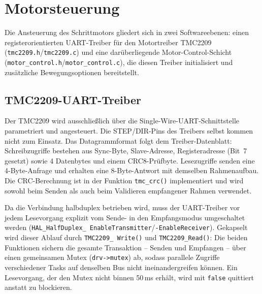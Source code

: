 \section{Motorsteuerung}

Die Ansteuerung des Schrittmotors gliedert sich in zwei Softwareebenen: einen registerorientierten UART-Treiber für den Motortreiber TMC2209 (\texttt{tmc2209.h}/\texttt{tmc2209.c}) und eine darüberliegende Motor-Control-Schicht (\texttt{motor\_control.h}/\texttt{motor\_control.c}), die diesen Treiber initialisiert und zusätzliche Bewegungsoptionen bereitstellt.

\subsection{TMC2209-UART-Treiber}

Der TMC2209 wird ausschließlich über die Single-Wire-UART-Schnittstelle  parametriert und angesteuert. Die STEP/DIR-Pins des Treibers selbst kommen nicht zum Einsatz. Das Datagrammformat folgt dem Treiber-Datenblatt: Schreibzugriffe bestehen aus Sync-Byte, Slave-Adresse, Registeradresse (Bit~7 gesetzt) sowie 4 Datenbytes und einem CRC8-Prüfbyte. Lesezugriffe senden eine 4-Byte-Anfrage und erhalten eine 8-Byte-Antwort mit demselben Rahmenaufbau. Die CRC-Berechnung ist in der Funktion \texttt{tmc\_crc()} implementiert und wird sowohl beim Senden als auch beim Validieren empfangener Rahmen verwendet.

Da die Verbindung halbduplex betrieben wird, muss der UART-Treiber vor jedem Lesevorgang explizit vom Sende- in den Empfangsmodus umgeschaltet werden (\texttt{HAL\_HalfDuplex\_ EnableTransmitter}/\texttt{-EnableReceiver}). Gekapselt wird dieser Ablauf durch \texttt{TMC2209\_ Write()} und \texttt{TMC2209\_Read()}: Die beiden Funktionen sichern die gesamte Transaktion – Senden und Empfangen – über einen gemeinsamen Mutex (\texttt{drv->mutex}) ab, sodass parallele Zugriffe verschiedener Tasks auf denselben Bus nicht ineinandergreifen können. Ein Lesevorgang, der den Mutex nicht binnen 50\,ms erhält, wird mit \texttt{false} quittiert anstatt zu blockieren.

